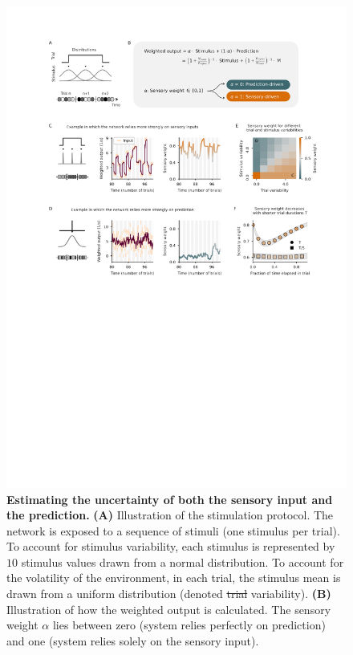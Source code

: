 \documentclass[10pt,a4paper]{article}
\providecommand{\DIFaddtex}[1]{{\protect\color{blue}\uwave{#1}}} %
\providecommand{\DIFdeltex}[1]{{\protect\color{red}\sout{#1}}}                      %
\providecommand{\DIFaddFL}[1]{\DIFadd{#1}} %
\providecommand{\DIFdelFL}[1]{\DIFdel{#1}} %
\providecommand{\DIFaddbeginFL}{} %
\providecommand{\DIFaddendFL}{} %
\providecommand{\DIFdelbeginFL}{} %
\providecommand{\DIFdelendFL}{} %
\providecommand{\DIFadd}[1]{\texorpdfstring{\DIFaddtex{#1}}{#1}} %
\providecommand{\DIFdel}[1]{\texorpdfstring{\DIFdeltex{#1}}{}} %
\newcommand{\DIFscaledelfig}{0.5}
\newlength{\DIFdelgraphicswidth} %
\newlength{\DIFdelgraphicsheight} %
\newcommand{\DIFaddincludegraphics}[2][]{{\color{blue}\fbox{\DIFOincludegraphics[#1]{#2}}}} %
\newcommand{\DIFdelincludegraphics}[2][]{%
\sbox{\DIFdelgraphicsbox}{\DIFOincludegraphics[#1]{#2}}%
\settoboxwidth{\DIFdelgraphicswidth}{\DIFdelgraphicsbox} %
\settoboxtotalheight{\DIFdelgraphicsheight}{\DIFdelgraphicsbox} %
\scalebox{\DIFscaledelfig}{%
\parbox[b]{\DIFdelgraphicswidth}{\usebox{\DIFdelgraphicsbox}\\[-\baselineskip] \rule{\DIFdelgraphicswidth}{0em}}\llap{\resizebox{\DIFdelgraphicswidth}{\DIFdelgraphicsheight}{%
\setlength{\unitlength}{\DIFdelgraphicswidth}%
\begin{picture}(1,1)%
\thicklines\linethickness{2pt} %
{\color[rgb]{1,0,0}\put(0,0){\framebox(1,1){}}}%
{\color[rgb]{1,0,0}\put(0,0){\line( 1,1){1}}}%
{\color[rgb]{1,0,0}\put(0,1){\line(1,-1){1}}}%
\end{picture}%
}\hspace*{3pt}}} %
} %
\DeclareRobustCommand{\DIFaddbeginFL}{\DIFOaddbeginFL \let\includegraphics\DIFaddincludegraphics} %
\DeclareRobustCommand{\DIFaddendFL}{\DIFOaddendFL \let\includegraphics\DIFOincludegraphics} %
\DeclareRobustCommand{\DIFdelbeginFL}{\DIFOdelbeginFL \let\includegraphics\DIFdelincludegraphics} %
\DeclareRobustCommand{\DIFdelendFL}{\DIFOaddendFL \let\includegraphics\DIFOincludegraphics} %
\begin{document}
\begin{figure}[t!]
	\centering
    \includegraphics[width=1\linewidth]{../results/figures/final/Fig_3}
\caption{\footnotesize{\bf Estimating the uncertainty of both the sensory input and the prediction.\newline} 
{\bf (A)} Illustration of the stimulation protocol. The network is exposed to a sequence of stimuli (one stimulus per trial). To account for stimulus variability, each stimulus is represented by $10$ stimulus values drawn from a normal distribution. To account for the volatility of the environment, in each trial, the stimulus mean is drawn from a uniform distribution (denoted \DIFdelbeginFL \DIFdelFL{trial }\DIFdelendFL \DIFaddbeginFL \DIFaddFL{trial-to-trial }\DIFaddendFL variability). 
{\bf (B)} Illustration of how the weighted output is calculated. The sensory weight $\alpha$ lies between zero (system relies perfectly on prediction) and one (system relies solely on the sensory input).
}
\end{figure}
\end{document}
